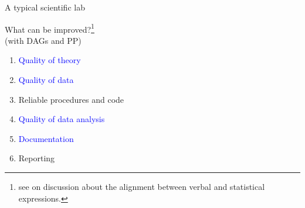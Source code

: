 %
%
\begin{lhframe}[rhgraphic={\texttt{[image: car\_salesman.jpg]}}]
	{A typical scientific lab}
	
	What can be improved?\footnote{see \citet{Yarkoni_2020, Rohrer_et_al_2021} on discussion about the alignment between verbal and statistical expressions.}\\
	{\small (with DAGs and PP)}
	\begin{enumerate}
		\item \textcolor{blue}{Quality of theory}
		\item \textcolor{blue}{Quality of data}
		\item \alert{Reliable procedures and code}
		\item \textcolor{blue}{Quality of data analysis}
		\item \textcolor{blue}{Documentation}
		\item Reporting
	\end{enumerate}
\end{lhframe}
%
%

